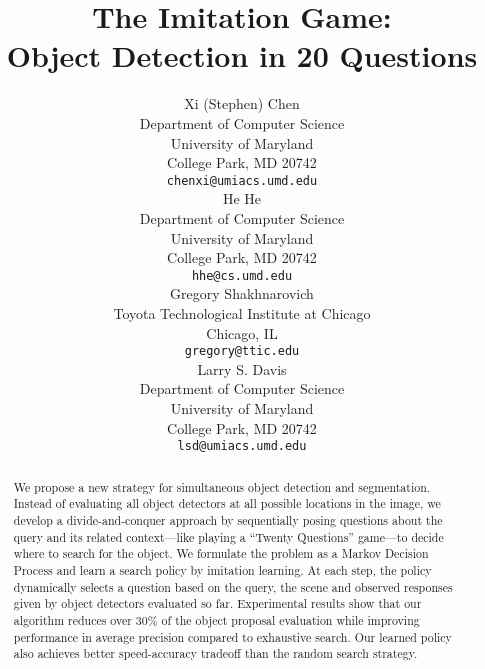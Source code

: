 \documentclass{article} %
\title{The Imitation Game:\\ Object Detection in 20 Questions}
\author{
Xi (Stephen) Chen\\
Department of Computer Science\\
University of Maryland\\
College Park, MD 20742 \\
\texttt{chenxi@umiacs.umd.edu} \\
\AND
He He \\
Department of Computer Science\\
University of Maryland\\
College Park, MD 20742 \\
\texttt{hhe@cs.umd.edu} \\
\And
Gregory Shakhnarovich\\
Toyota Technological Institute at Chicago \\
Chicago, IL\\
\texttt{gregory@ttic.edu} \\
\And
Larry S. Davis \\
Department of Computer Science\\
University of Maryland\\
College Park, MD 20742 \\
\texttt{lsd@umiacs.umd.edu} 
}
\theoremstyle{definition}
\begin{document}
\maketitle

\begin{abstract}
We propose a new strategy for simultaneous object detection and segmentation. Instead of evaluating all object detectors at all possible locations in the
image, we develop a divide-and-conquer approach by sequentially posing questions about the query and its related context---like playing a ``Twenty Questions'' game---to decide where to search for the object. We formulate the problem as a Markov Decision Process and learn a search policy by imitation learning. At each step, the policy dynamically selects a question based on the query, the scene and observed responses given by object detectors evaluated so far.
Experimental results show that our
algorithm reduces over 30\% of the object proposal evaluation while improving performance in average precision compared to exhaustive search. 
Our learned policy also achieves better speed-accuracy tradeoff than the random search strategy.
\end{abstract}






% 






{\small


}
\end{document}
